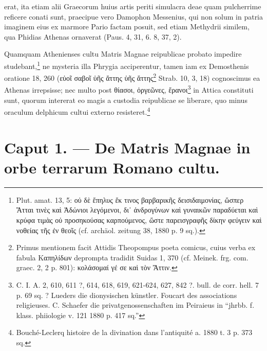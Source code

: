 \documentclass[a4paper, 11pt, oneside, polutonikogreek, german]{article}
\begin{document}
erat, ita etiam alii Graecorum huius artis periti simulacra deae quam pulcherrime reficere conati sunt, praecipue vero Damophon Messenius, qui non solum in patria imaginem eius ex marmore Pario factam posuit, sed etiam Methydrii similem, qua Phidias Athenas ornaverat (Paus. 4, 31, 6. 8, 37, 2).

Quamquam Athenienses cultu Matris Magnae reipublicae probato impedire studebant,\footnote{Plut. amat. 13, 5: οὐ δὲ ἔπηλυς ἔκ τινος βαρβαρικῆς δεισιδαιμονίας, ὥσπερ Ἄτται τινὲς καὶ Ἀδώνιοι λεγόμενοι, δι᾽ ἀνδρογύνων καὶ γυναικῶν παραδύεται καὶ κρύφα τιμὰς οὐ προσηκούσας καρπούμενος, ὥστε παρεισγραφῆς δίκην φεύγειν καὶ νοθείας τῆς ἐν θεοῖς (cf. archäol. zeitung 38, 1880 p. 9 sq.).} ne mysteria illa Phrygia acciperentur, tamen iam ex Demosthenis oratione 18, 260 (εὐοῖ σαβοῖ ὑῆς ἄττης ὑῆς ἄττης\footnote{Primus mentionem facit Attidis Theopompus poeta comicus, cuius verba ex fabula Καπηλίδων deprompta tradidit Suidas 1, 370 (cf. Meinek. frg. com. graec. 2, 2 p. 801): κολάσομαί γέ σε καὶ τὸν Ἄττιν.} Strab. 10, 3, 18) cognoscimus ea Athenas irrepsisse; nec multo post θίασοι, ὀργεῶνες, ἔρανοι\footnote{C. I. A. 2, 610, 611 ?, 614, 618, 619, 621-624, 627, 842 ?. bull. de corr. hell. 7 p. 69 sq. ? Lueders die dionysischen künstler. Foucart des associations religieuses. C. Schaefer die privatgenossenschaften im Peiraieus in "`jhrbb. f. klass. phiiologie v. 121 1880 p. 417 sq."'} in Attica constituti sunt, quorum intererat eo magis a custodia reipublicae se liberare, quo minus oraculum delphicum cultui externo resisteret.\footnote{Bouché-Leclerq histoire de la divination dans l'antiquité a. 1880 t. 3 p. 373 sq.}
\clearpage
\section{Caput 1. --- De Matris Magnae in orbe terrarum Romano cultu.}
\end{document}
